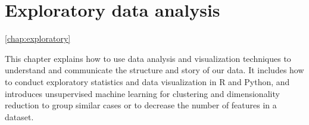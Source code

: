 \chapter{Exploratory data analysis}
\ref{chap:exploratory}

This chapter explains how to use data analysis and visualization techniques to understand and communicate the structure and story of our data.  It includes how to conduct exploratory statistics and data visualization in R and Python, and introduces unsupervised machine learning for clustering and dimensionality reduction to group similar cases or to decrease the number of features in a dataset.







